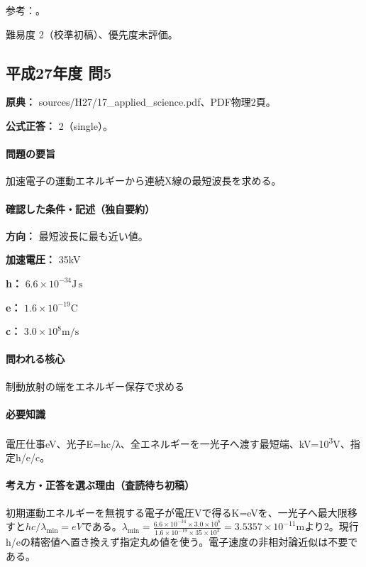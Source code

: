 \par 参考：\cite{os_matter}。

\par 難易度 2（校準初稿）、優先度未評価。

\subsection{平成27年度 問5}
\label{q:h27-reg-applied-05}

\noindent\textbf{原典：} sources/H27/17\_applied\_science.pdf、PDF物理2頁。

\textbf{公式正答：} 2（single）。

\paragraph{問題の要旨} 加速電子の運動エネルギーから連続X線の最短波長を求める。

\paragraph{確認した条件・記述（独自要約）}\mbox{}\par

\noindent\textbf{方向：} 最短波長に最も近い値。\par

\noindent\textbf{加速電圧：} 35kV\par

\noindent\textbf{h：} \(6.6\times10^{-34}\mathrm{J\,s}\)\par

\noindent\textbf{e：} \(1.6\times10^{-19}\mathrm{C}\)\par

\noindent\textbf{c：} \(3.0\times10^8\mathrm{m/s}\)\par

\paragraph{問われる核心} 制動放射の端をエネルギー保存で求める

\paragraph{必要知識} 電圧仕事eV、光子E=\allowbreak{}hc/λ、全エネルギーを一光子へ渡す最短端、kV=\allowbreak{}10\textsuperscript{3}V、指定h/e/c。

\paragraph{考え方・正答を選ぶ理由（査読待ち初稿）} 初期運動エネルギーを無視する電子が電圧Vで得るK=\allowbreak{}eVを、一光子へ最大限移すと\(hc/\lambda_{\min}=eV\)である。\(\lambda_{\min}=\frac{6.6\times10^{-34}\times3.0\times10^8}{1.6\times10^{-19}\times35\times10^3}=3.5357\times10^{-11}\mathrm{m}\)より2。現行h/eの精密値へ置き換えず指定丸め値を使う。電子速度の非相対論近似は不要である。

